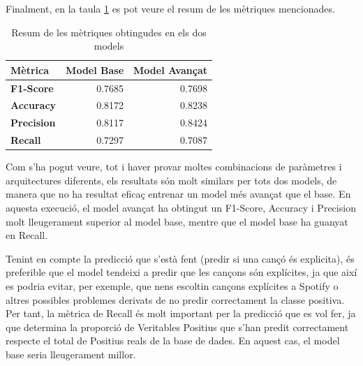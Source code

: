 Finalment, en la taula \ref{tab:6_FM:NN_metriques} es pot veure el resum de les mètriques mencionades. 

\begin{table}[H]
    \centering
    \begin{tabular}{lrr}
        \toprule
        \textbf{Mètrica} & \textbf{Model Base} & \textbf{Model Avançat} \\
        \midrule
        \textbf{F1-Score} & 0.7685 & 0.7698 \\
        \textbf{Accuracy} & 0.8172 & 0.8238 \\
        \textbf{Precision} & 0.8117 & 0.8424 \\
        \textbf{Recall} & 0.7297 & 0.7087 \\
        \bottomrule
    \end{tabular}
    \caption{Resum de les mètriques obtingudes en els dos models}
    \label{tab:6_FM:NN_metriques}
\end{table}

Com s'ha pogut veure, tot i haver provar moltes combinacions de paràmetres i arquitectures diferents, els resultats són molt similars per tots dos models, de manera que no ha resultat eficaç entrenar un model més avançat que el base. En aquesta execució, el model avançat ha obtingut un F1-Score, Accuracy i Precision molt lleugerament superior al model base, mentre que el model base ha guanyat en Recall. 

Tenint en compte la predicció que s'està fent (predir si una cançó és explicita), és preferible que el model tendeixi a predir que les cançons són explícites, ja que així es podria evitar, per exemple, que nens escoltin cançons explícites a Spotify o altres possibles problemes derivats de no predir correctament la classe positiva. Per tant, la mètrica de Recall és molt important per la predicció que es vol fer, ja que determina la proporció de Veritables Positius que s'han predit correctament respecte el total de Positius reals de la base de dades. En aquest cas, el model base seria lleugerament millor.



           
                                      